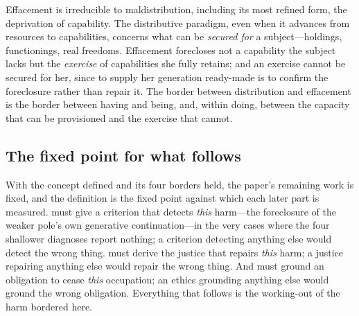 \begin{claim}
Effacement is irreducible to maldistribution, including its most refined form, the deprivation of capability. The distributive paradigm, even when it advances from resources to capabilities, concerns what can be \emph{secured for} a subject---holdings, functionings, real freedoms. Effacement forecloses not a capability the subject lacks but the \emph{exercise} of capabilities she fully retains; and an exercise cannot be secured for her, since to supply her generation ready-made is to confirm the foreclosure rather than repair it. The border between distribution and effacement is the border between having and being, and, within doing, between the capacity that can be provisioned and the exercise that cannot.
\end{claim}

\subsection{The fixed point for what follows}
\label{p18:sub:def-shape}

With the concept defined and its four borders held, the paper's remaining work is fixed, and the definition is the fixed point against which each later part is measured.  must give a criterion that detects \emph{this} harm---the foreclosure of the weaker pole's own generative continuation---in the very cases where the four shallower diagnoses report nothing; a criterion detecting anything else would detect the wrong thing.  must derive the justice that repairs \emph{this} harm; a justice repairing anything else would repair the wrong thing. And  must ground an obligation to cease \emph{this} occupation; an ethics grounding anything else would ground the wrong obligation. Everything that follows is the working-out of the harm bordered here.
